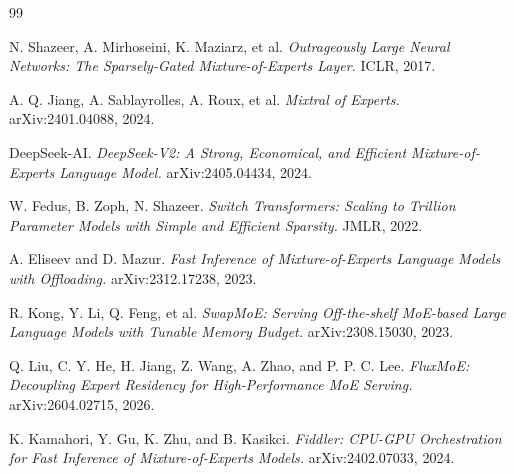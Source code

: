 \documentclass[11pt,a4paper]{article}
\begin{document}

\begin{thebibliography}{99}


N. Shazeer, A. Mirhoseini, K. Maziarz, et al.
\textit{Outrageously Large Neural Networks: The Sparsely-Gated Mixture-of-Experts Layer.}
ICLR, 2017.

A. Q. Jiang, A. Sablayrolles, A. Roux, et al.
\textit{Mixtral of Experts.}
arXiv:2401.04088, 2024.

DeepSeek-AI.
\textit{DeepSeek-V2: A Strong, Economical, and Efficient Mixture-of-Experts Language Model.}
arXiv:2405.04434, 2024.

W. Fedus, B. Zoph, N. Shazeer.
\textit{Switch Transformers: Scaling to Trillion Parameter Models with Simple and Efficient Sparsity.}
JMLR, 2022.

A. Eliseev and D. Mazur.
\textit{Fast Inference of Mixture-of-Experts Language Models with Offloading.}
arXiv:2312.17238, 2023.

R. Kong, Y. Li, Q. Feng, et al.
\textit{SwapMoE: Serving Off-the-shelf MoE-based Large Language Models with Tunable Memory Budget.}
arXiv:2308.15030, 2023.

Q. Liu, C. Y. He, H. Jiang, Z. Wang, A. Zhao, and P. P. C. Lee.
\textit{FluxMoE: Decoupling Expert Residency for High-Performance MoE Serving.}
arXiv:2604.02715, 2026.

K. Kamahori, Y. Gu, K. Zhu, and B. Kasikci.
\textit{Fiddler: CPU-GPU Orchestration for Fast Inference of Mixture-of-Experts Models.}
arXiv:2402.07033, 2024.

\end{thebibliography}
\end{document}

